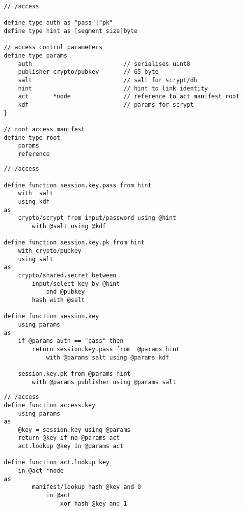 \begin{definition}\label{def:ac}
\begin{lstlisting}[language=buzz1]
// /access

define type auth as "pass"|"pk" 
define type hint as [segment size]byte

// access control parameters
define type params
	auth                          // serialises uint8
	publisher crypto/pubkey       // 65 byte
	salt                          // salt for scrypt/dh
	hint                          // hint to link identity
	act       *node               // reference to act manifest root
	kdf                           // params for scrypt
} 

// root access manifest
define type root
    params
    reference

\end{lstlisting}
\end{definition}


\begin{definition}\label{def:session-key}
\begin{lstlisting}[language=buzz1]
// /access

define function session.key.pass from hint 
    with  salt 
    using kdf
as
    crypto/scrypt from input/password using @hint
        with @salt using @kdf

define function session.key.pk from hint
    with crypto/pubkey
    using salt
as
    crypto/shared.secret between 
        input/select key by @hint
            and @pubkey 
        hash with @salt
      
define function session.key 
    using params
as
    if @params auth == "pass" then
        return session.key.pass from  @params hint 
            with @params salt using @params kdf
                
    session.key.pk from @params hint 
        with @params publisher using @params salt
\end{lstlisting}
\end{definition}


\begin{definition}\label{def:access-key}
\begin{lstlisting}[language=buzz1]
// /access
define function access.key 
    using params
as 
    @key = session.key using @params 
    return @key if no @params act
    act.lookup @key in @params act
   
define function act.lookup key
    in @act *node
as
        manifest/lookup hash @key and 0
            in @act
                xor hash @key and 1


\end{lstlisting}
\end{definition}



